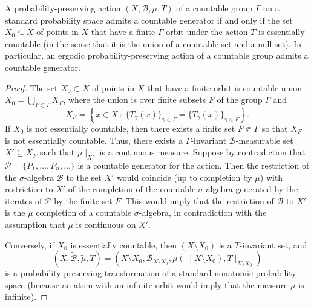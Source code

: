 \documentclass[12pt,reqno]{amsart}
\begin{document}
\begin{cor}
A   probability-preserving action $(X,\mathcal{B},\mu,T)$ of a countable group  $\Gamma$ on a standard probability space admits a countable generator if and only if the set $X_0 \subseteq X$ of points in $X$ that have a finite $\Gamma$ orbit under the action $T$ is essentially countable (in the sense that it is the union of a countable set and a null set). In particular, an ergodic probability-preserving action of a countable group admits a countable generator.
\end{cor}
\begin{proof}
The set $X_0 \subset X$ of points in $X$ that have a finite orbit is countable union $X_0 = \bigcup_{F \Subset \Gamma} X_F$, where the union is over finite subsets $F$ of the group $\Gamma$ and 
\[
X_F = \left\{ x \in X~:~ \{T_\gamma(x)\}_{\gamma \in \Gamma} = \{T_\gamma(x)\}_{\gamma \in F} \right\}.
\]
If $X_0$ is not essentially countable, then there exists a finite set $F \Subset \Gamma$ so that $X_F$ is not essentially countable. 
Thus, there exists a $\Gamma$-invariant $\mathcal{B}$-measurable set  $X' \subseteq X_F$ such that $\mu\mid_{X'}$ is a continuous measure. Suppose by contradiction that $\mathcal{P}=\{P_1,\ldots,P_n,\ldots\}$
is a countable generator for the action. Then the restriction of the $\sigma$-algebra $\mathcal{B}$ to the set $X'$ would coincide (up to completion by $\mu$) with restriction to $X'$ of the completion of the countable $\sigma$ algebra generated by the iterates of $\mathcal{P}$ by the finite set $F$.
This would imply that the restriction of $\mathcal{B}$ to $X'$ is the $\mu$ completion of a countable $\sigma$-algebra, in contradiction with the assumption that $\mu$ is continuous on $X'$.


Conversely, if $X_0$ is essentially countable, then $(X \setminus X_0)$ is a $T$-invariant set, and
\[(\tilde X,\tilde{\mathcal{B}}, \tilde \mu, \tilde T) =  (X\setminus X_0, \mathcal{B}_{X\setminus X_0}, \mu(\cdot\mid X \setminus X_0), T\mid_{X \setminus X_0})\] 
is a probability preserving transformation of a standard nonatomic probability space (because an atom with an infinite orbit would imply that the measure $\mu$ is infinite).


\end{proof}
\end{document}
